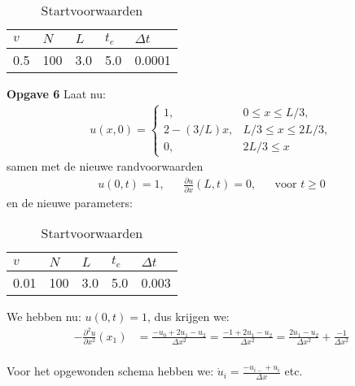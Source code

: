 \documentclass{article}
\newcommand{\Dt}{\Delta t}
\begin{document}
\begin{table}[H]
\centering
\label{tab:specs}
\begin{tabular}{|l|l|l|l|l|}
\hline
\(v\) & \(N\) & \(L\) & \(t_e\) & \(\Dt\) \\ \hline
 0.5 & 100 & 3.0 & 5.0 & 0.0001 \\ \hline
\end{tabular}
\caption{Startvoorwaarden}
\end{table}
\textbf{Opgave 6}
Laat nu: 
\begin{align*}
	u(x,0) =\begin{cases}
	1, & 0\leq x \leq L/3,\\
	2-(3/L)x, & L/3 \leq x\leq 2L/3,\\
	0, & 2L/3 \leq x
	\end{cases}
\end{align*}
samen met de nieuwe randvoorwaarden 
\begin{align*}
u(0,t)=1,&&\frac{\partial u}{\partial x}(L,t)=0,&&\mbox{voor }t\geq 0
\end{align*}
en de nieuwe parameters:
\begin{table}[H]
\centering
\label{tab:specs2}
\begin{tabular}{|l|l|l|l|l|}
\hline
\(v\) & \(N\) & \(L\) & \(t_e\) & \(\Dt\) \\ \hline
 0.01 & 100 & 3.0 & 5.0 & 0.003 \\ \hline
\end{tabular}
\caption{Startvoorwaarden}
\end{table}

We hebben nu: $u(0,t) = 1$, dus krijgen we:
\begin{align*}
-\frac{\partial^2 u}{\partial x^2}(x_1) &= \frac{-u_{0}+2u_1-u_{2}}{\Delta x^2}
= \frac{-1+2u_1-u_{2}}{\Delta x^2}
= \frac{2u_1-u_{2}}{\Delta x^2} +\frac{-1}{\Delta x^2}\\
\end{align*}

Voor het opgewonden schema hebben we:
$\dot{u}_{i} =\frac{-u_{i-}+u_{i}}{\Delta x}$
etc. 
\end{document}
